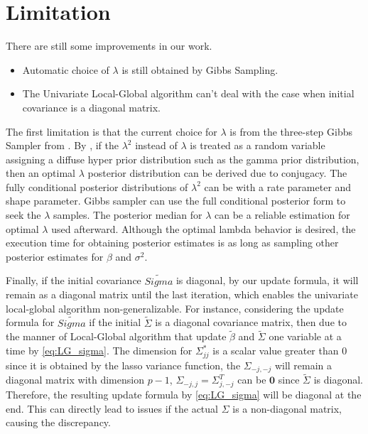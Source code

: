%
%


\label{Chapter5}
\section{Limitation}
There are still some improvements in our work.


\begin{itemize}
	\item Automatic choice of $\lambda$ is still obtained by Gibbs Sampling.
	\item The Univariate Local-Global algorithm can't deal with the case when initial covariance is a diagonal matrix. 
\end{itemize}
The first limitation is that the current choice for $\lambda$ is from the three-step Gibbs Sampler from \cite{park_casella_2008}. By \cite{park_casella_2008}, if the $\lambda^2$ instead of $\lambda$ is treated as a random variable assigning a diffuse hyper prior distribution such as the gamma prior distribution, then an optimal $\lambda$ posterior distribution can be derived due to conjugacy. The fully conditional posterior distributions of $\lambda^2$ can be with a rate parameter and shape parameter. Gibbs sampler can use the full conditional posterior form to seek the $\lambda$ samples. The posterior median for $\lambda$ can be a reliable estimation for optimal $\lambda$ used afterward. Although the optimal lambda behavior is desired, the execution time for obtaining posterior estimates is as long as sampling other posterior estimates for $\beta$ and $\sigma^2$.

Finally, if the initial covariance $\tilde{Sigma}$ is diagonal, by our update formula, it will remain as a diagonal matrix until the last iteration, which enables the univariate local-global algorithm non-generalizable.
For instance, considering the update formula for $\tilde{Sigma}$ if the initial $\tilde{\Sigma}$ is a diagonal covariance matrix, then 
due to the manner of Local-Global algorithm that update $\tilde{\beta}$ and $\tilde{\Sigma}$ one variable at a time by \autoref{eq:LG_sigma}. The dimension for $\Sigma_{jj}^{*}$ is a scalar value greater than 0 since it is obtained by the lasso variance function, the $\Sigma_{-j,-j}$ will remain a diagonal matrix with dimension $p-1$, $\Sigma_{-j,j} = \Sigma_{j,-j}^T$ can be $\mathbf{0}$ since $\tilde{\Sigma}$ is diagonal. Therefore, the resulting update formula by \autoref{eq:LG_sigma} will be diagonal at the end. This can directly lead to issues if the actual $\Sigma$ is a non-diagonal matrix, causing the discrepancy.


